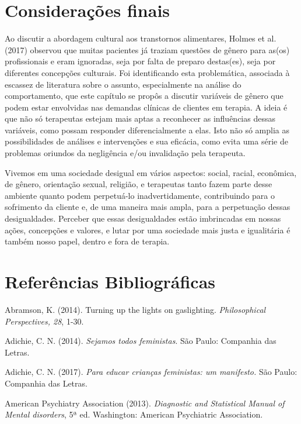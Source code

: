 \section*{Considerações finais}

Ao discutir a abordagem cultural aos transtornos alimentares, Holmes et al. (2017) observou que muitas pacientes já traziam questões de gênero para as(os) profissionais e eram ignoradas, seja por falta de preparo destas(es), seja por diferentes concepções culturais. Foi identificando esta problemática, associada à escassez de literatura sobre o assunto, especialmente na análise do comportamento, que este capítulo se propôs a discutir variáveis de gênero que podem estar envolvidas nas demandas clínicas de clientes em terapia. A ideia é que não só terapeutas estejam mais aptas a reconhecer as influências dessas variáveis, como possam responder diferencialmente a elas. Isto não só amplia as possibilidades de análises e intervenções e sua eficácia, como evita uma série de problemas oriundos da negligência e/ou invalidação pela terapeuta.

Vivemos em uma sociedade desigual em vários aspectos: social, racial, econômica, de gênero, orientação sexual, religião, e terapeutas tanto fazem parte desse ambiente quanto podem perpetuá-lo inadvertidamente, contribuindo para o sofrimento da cliente e, de uma maneira mais ampla, para a perpetuação dessas desigualdades. Perceber que essas desigualdades estão imbrincadas em nossas ações, concepções e valores, e lutar por uma sociedade mais justa e igualitária é também nosso papel, dentro e fora de terapia.
\vfill
\newpage
\section*{Referências Bibliográficas}

\hangindent=25pt
\noindent Abramson, K. (2014). Turning up the lights on gaslighting. \textit{Philosophical Perspectives, 28}, 1-30.

\hangindent=25pt
\noindent Adichie, C. N. (2014). \textit{Sejamos todos feministas}. São Paulo: Companhia das Letras.

\hangindent=25pt
\noindent Adichie, C. N. (2017). \textit{Para educar crianças feministas: um manifesto.} São Paulo: Companhia das Letras. 

\hangindent=25pt
\noindent American Psychiatry Association (2013). \textit{Diagnostic and Statistical Manual of Mental disorders}, 5ª ed. Washington: American Psychiatric Association.

